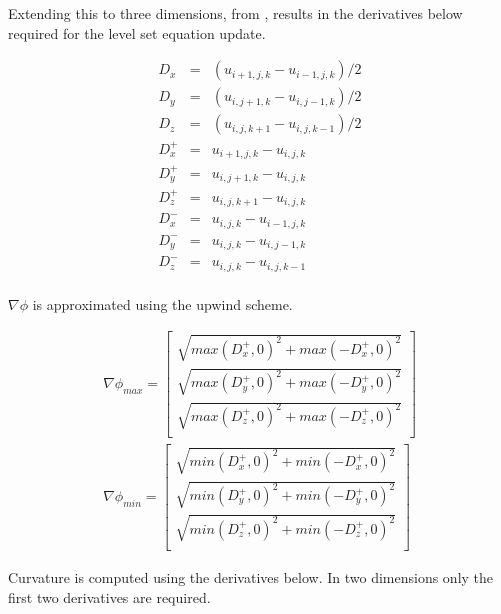 Extending this to three dimensions, from \cite{Lefohn04astreaming}, results in the derivatives below required for the level set equation update. 

\begin{eqnarray}
	D_x &=& (u_{i+1,j,k}-u_{i-1,j,k})/2 \nonumber\\
	D_y &=& (u_{i,j+1,k}-u_{i,j-1,k})/2 \nonumber\\
	D_z &=& (u_{i,j,k+1}-u_{i,j,k-1})/2 \nonumber\\
	D_x^+ &=& u_{i+1,j,k}-u_{i,j,k} \nonumber\\
	D_y^+ &=& u_{i,j+1,k}-u_{i,j,k} \nonumber\\
	D_z^+ &=& u_{i,j,k+1}-u_{i,j,k} \nonumber\\
	D_x^- &=& u_{i,j,k}-u_{i-1,j,k} \nonumber\\
	D_y^- &=& u_{i,j,k}-u_{i,j-1,k} \nonumber\\
	D_z^- &=& u_{i,j,k}-u_{i,j,k-1} \nonumber\\
\end{eqnarray}

$\nabla\phi$ is approximated using the upwind scheme.

\begin{eqnarray}
\nabla\phi_{max} = \left[
  \begin{array}{ c }
     \sqrt{max(D_x^+, 0)^2 + max(-D_x^+,0)^2}  \\[2em]
     \sqrt{max(D_y^+, 0)^2 + max(-D_y^+,0)^2}  \\[2em]
     \sqrt{max(D_z^+, 0)^2 + max(-D_z^+,0)^2}  \\[2em]
  \end{array} \right] \\
\nabla\phi_{min} = \left[
  \begin{array}{ c }
     \sqrt{min(D_x^+, 0)^2 + min(-D_x^+,0)^2}  \\[2em]
     \sqrt{min(D_y^+, 0)^2 + min(-D_y^+,0)^2}  \\[2em]
     \sqrt{min(D_z^+, 0)^2 + min(-D_z^+,0)^2}  \\[2em]  
  \end{array} \right] 
\end{eqnarray}

Curvature is computed using the derivatives below. In two dimensions only the first two derivatives are required.

